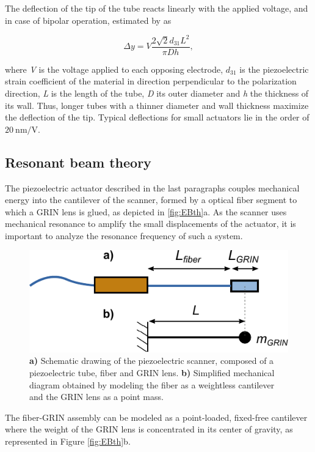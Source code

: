 \documentclass[10pt]{iopart}
\begin{document}
The deflection of the tip of the tube reacts linearly with the applied voltage, and in case of bipolar operation, estimated by \cite{Chen} as

\begin{equation}
\Delta y = V  \frac{2 \sqrt{2} d_{31} L^2}{\pi D h},
\end{equation}

where \textit{V} is the voltage applied to each opposing electrode, $d_{31}$ is the piezoelectric strain coefficient of the material in direction perpendicular to the polarization direction, \textit{L} is the length of the tube, \textit{D} its outer diameter and \textit{h} the thickness of its wall. Thus, longer tubes with a thinner diameter and wall thickness maximize the deflection of the tip. Typical deflections for small actuators lie in the order of $\SI{20}{\nano\meter / \volt}$.


\subsection{Resonant beam theory}
\label{sec:EB}
The piezoelectric actuator described in the last paragraphs couples mechanical energy into the cantilever of the scanner, formed by a optical fiber segment to which a GRIN lens is glued, as depicted in \autoref{fig:EBth}a. As the scanner uses mechanical resonance to amplify the small displacements of the actuator, it is important to analyze the resonance frequency of such a system. 

\begin{figure}[h!]\centering
      \includegraphics[width=\columnwidth]{figures/EB.pdf}
      \caption{\textbf{a)} Schematic drawing of the piezoelectric scanner, composed of a piezoelectric tube, fiber and GRIN lens. 
      \textbf{b)} Simplified mechanical diagram obtained by modeling the fiber as a weightless cantilever and the GRIN lens as a point mass.}
      \label{fig:EB}
\end{figure}

The fiber-GRIN assembly can be modeled as a point-loaded, fixed-free cantilever where the weight of the GRIN lens is concentrated in its center of gravity, as represented in Figure \ref{fig:EBth}b. 
\end{document}
